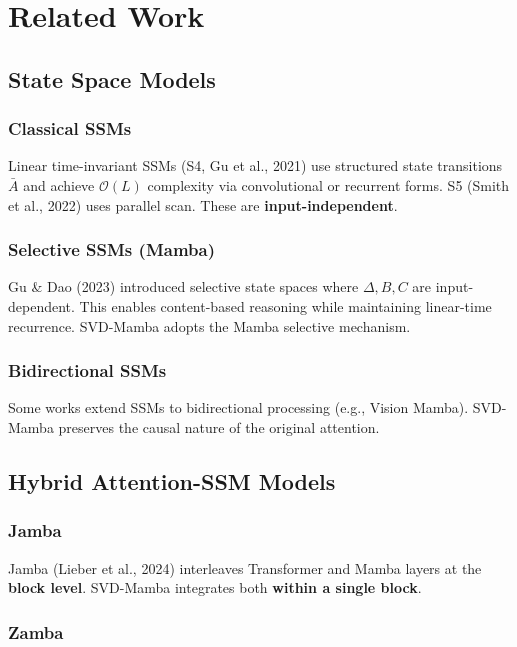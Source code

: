
\section{Related Work}

\subsection{State Space Models}

\subsubsection{Classical SSMs}

Linear time-invariant SSMs (S4, Gu et al., 2021) use structured state 
transitions $\bar{A}$ and achieve $\mathcal{O}(L)$ complexity via 
convolutional or recurrent forms. S5 (Smith et al., 2022) uses parallel 
scan. These are \textbf{input-independent}.

\subsubsection{Selective SSMs (Mamba)}

Gu \& Dao (2023) introduced selective state spaces where $\Delta, B, C$ 
are input-dependent. This enables content-based reasoning while maintaining 
linear-time recurrence. SVD-Mamba adopts the Mamba selective mechanism.

\subsubsection{Bidirectional SSMs}

Some works extend SSMs to bidirectional processing (e.g., Vision Mamba). 
SVD-Mamba preserves the causal nature of the original attention.

\subsection{Hybrid Attention-SSM Models}

\subsubsection{Jamba}

Jamba (Lieber et al., 2024) interleaves Transformer and Mamba layers at 
the \textbf{block level}. SVD-Mamba integrates both \textbf{within a single block}.

\subsubsection{Zamba}

